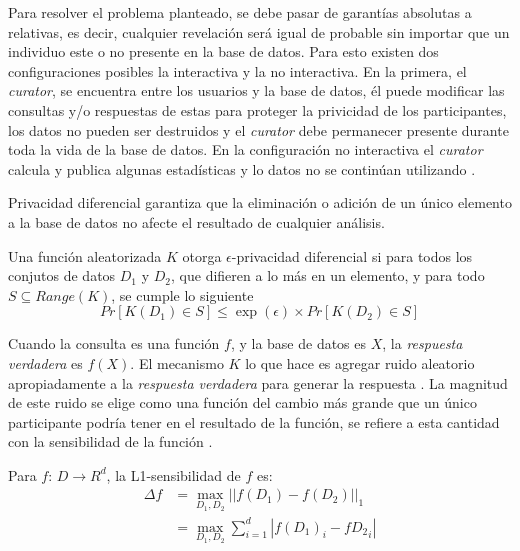 Para resolver el problema planteado, se debe pasar de garantías absolutas a relativas, es decir, cualquier revelación será igual de probable sin importar que un individuo este o no presente en la base de datos. Para esto existen dos configuraciones posibles la interactiva y la no interactiva. En la primera, el \textit{curator}, se encuentra entre los usuarios y la base de datos, él puede modificar las consultas y/o respuestas de estas para proteger la privicidad de los participantes, los datos no pueden ser destruidos y el \textit{curator} debe permanecer presente durante toda la vida de la base de datos. En la configuración no interactiva el \textit{curator} calcula y publica algunas estadísticas y lo datos no se continúan utilizando \cite{dwork2008differential}.

Privacidad diferencial garantiza que la eliminación o adición de un único elemento a la base de datos no afecte el resultado de cualquier análisis.

\begin{definicion}
  Una función aleatorizada $K$ otorga $\epsilon$-privacidad diferencial si para todos los conjutos de datos $D_1$ y $D_2$, que difieren a lo más en un elemento, y para todo $S \subseteq Range(K)$, se cumple lo siguiente
  \begin{equation}
    Pr[K(D_1) \in S] \leq \exp(\epsilon) \times Pr[K(D_2) \in S]
  \end{equation}
\end{definicion}

Cuando la consulta es una función $f$, y la base de datos es $X$, la \textit{respuesta verdadera} es $f(X)$. El mecanismo $K$ lo que hace es agregar ruido aleatorio apropiadamente a la \textit{respuesta verdadera} para generar la respuesta \cite{dwork2008differential}. La magnitud de este ruido se elige como una función del cambio más grande que un único participante podría tener en el resultado de la función, se refiere a esta cantidad con la sensibilidad de la función \cite{dwork2011differential}.

\begin{definicion}
  Para $f$: $D \to R^d$, la L1-sensibilidad de $f$ es:
  \begin{equation}
    \begin{split}
      \Delta f & = \max_{D_1, D_2} || f(D_1) - f(D_2) ||_1 \\
              & = \max_{D_1, D_2} \sum_{i=1}^{d} |f(D_1)_i - f{D_2}_i|
     \end{split}
  \end{equation}
\end{definicion}

